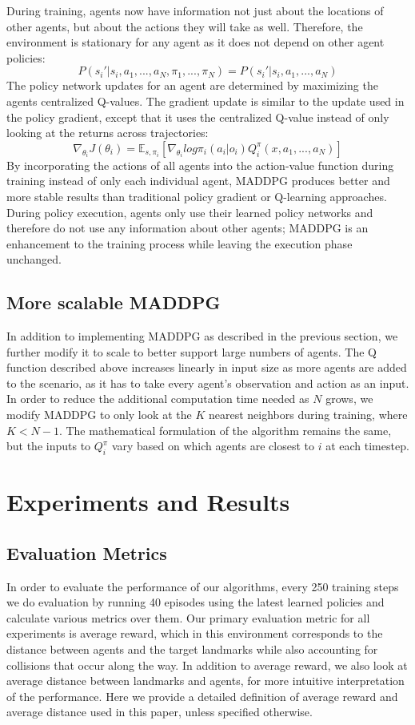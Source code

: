 \documentclass{article}
\begin{document}
During training, agents now have information not just about the locations of other agents, but about the actions they will take as well. Therefore, the environment is stationary for any agent as it does not depend on other agent policies:
$$P(s_i'|s_i, a_1, ..., a_N, \pi_1, ..., \pi_N) = P(s_i'|s_i, a_1, ..., a_N)$$
The policy network updates for an agent are determined by maximizing the agents centralized Q-values. The gradient update is similar to the update used in the policy gradient, except that it uses the centralized Q-value instead of only looking at the returns across trajectories:
$$\nabla_{\theta_i}J(\theta_i) = \mathbb{E}_{s, \pi_i}[\nabla_{\theta_i}log \pi_i(a_i|o_i)Q^{\pi}_i(x, a_1, ..., a_N)]$$
By incorporating the actions of all agents into the action-value function during training instead of only each individual agent, MADDPG produces better and more stable results than traditional policy gradient or Q-learning approaches. During policy execution, agents only use their learned policy networks and therefore do not use any information about other agents; MADDPG is an enhancement to the training process while leaving the execution phase unchanged.

\subsection{More scalable MADDPG}
In addition to implementing MADDPG as described in the previous section, we further modify it to scale to better support large numbers of agents. The Q function described above increases linearly in input size as more agents are added to the scenario, as it has to take every agent's observation and action as an input. In order to reduce the additional computation time needed as $N$ grows, we modify MADDPG to only look at the $K$ nearest neighbors during training, where $K < N-1$. The mathematical formulation of the algorithm remains the same, but the inputs to $Q^\pi_i$ vary based on which agents are closest to $i$ at each timestep.

\section{Experiments and Results}
\subsection{Evaluation Metrics}

In order to evaluate the performance of our algorithms, every 250 training steps we do evaluation by running 40 episodes using the latest learned policies and calculate various metrics over them. Our primary evaluation metric for all experiments is average reward, which in this environment corresponds to the distance between agents and the target landmarks while also accounting for collisions that occur along the way. In addition to average reward, we also look at average distance between landmarks and agents, for more intuitive interpretation of the performance. Here we provide a detailed definition of average reward and average distance used in this paper, unless specified otherwise.
\end{document}
